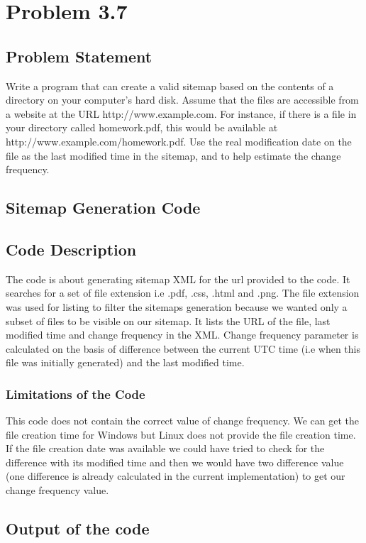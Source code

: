 \documentclass[12pt]{report}
\begin{document}
\chapter{Problem 3.7}
\section{Problem Statement}
Write a program that can create a valid sitemap based on the contents of a directory on your computer’s hard disk. Assume that the files are accessible from a website at the URL http://www.example.com. For instance, if there is a file in your directory called homework.pdf, this would be available at http://www.example.com/homework.pdf. Use the real modification date on the file as the last modified time in the sitemap, and to help estimate the change frequency.
\section{Sitemap Generation Code}

\section{Code Description}
The code is about generating sitemap XML for the url provided to the code. It searches for a set of file extension i.e .pdf, .css, .html and .png. \cite{9} The file extension was used for listing to filter the sitemaps generation because we wanted only a subset of files to be visible on our sitemap. It lists the URL of the file, last modified time and change frequency in the XML. Change frequency parameter is calculated on the basis of difference between the current UTC time (i.e when this file was initially generated) and the last modified time. 
\subsection{Limitations of the Code}
This code does not contain the correct value of change frequency. We can get the file creation time for Windows but Linux does not provide the file creation time. \cite{10} If the file creation date was available we could have tried to check for the difference with its modified time and then we would have two difference value (one difference is already calculated in the current implementation) to get our change frequency value.  
\section{Output of the code}
\end{document}
